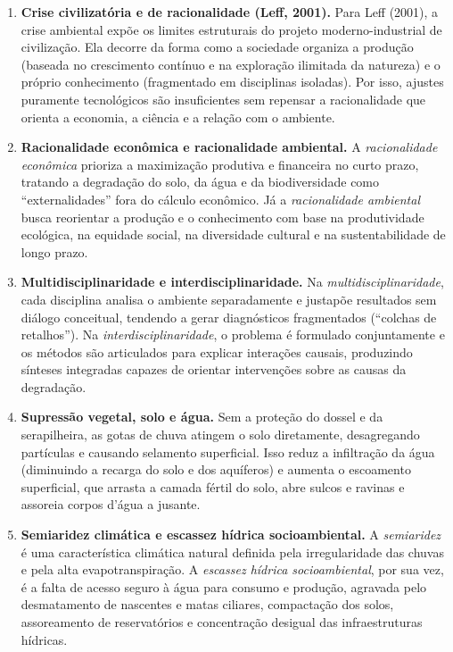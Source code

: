 \clearpage
{}

\begin{boxGabarito}
\begin{enumerate}[leftmargin=1.8em, itemsep=4pt]
  \item \textbf{Crise civilizatória e de racionalidade (Leff, 2001).} Para Leff (2001), a crise ambiental expõe os limites estruturais do projeto moderno-industrial de civilização. Ela decorre da forma como a sociedade organiza a produção (baseada no crescimento contínuo e na exploração ilimitada da natureza) e o próprio conhecimento (fragmentado em disciplinas isoladas). Por isso, ajustes puramente tecnológicos são insuficientes sem repensar a racionalidade que orienta a economia, a ciência e a relação com o ambiente.

  \item \textbf{Racionalidade econômica e racionalidade ambiental.} A \emph{racionalidade econômica} prioriza a maximização produtiva e financeira no curto prazo, tratando a degradação do solo, da água e da biodiversidade como ``externalidades'' fora do cálculo econômico. Já a \emph{racionalidade ambiental} busca reorientar a produção e o conhecimento com base na produtividade ecológica, na equidade social, na diversidade cultural e na sustentabilidade de longo prazo.

  \item \textbf{Multidisciplinaridade e interdisciplinaridade.} Na \emph{multidisciplinaridade}, cada disciplina analisa o ambiente separadamente e justapõe resultados sem diálogo conceitual, tendendo a gerar diagnósticos fragmentados (``colchas de retalhos''). Na \emph{interdisciplinaridade}, o problema é formulado conjuntamente e os métodos são articulados para explicar interações causais, produzindo sínteses integradas capazes de orientar intervenções sobre as causas da degradação.

  \item \textbf{Supressão vegetal, solo e água.} Sem a proteção do dossel e da serapilheira, as gotas de chuva atingem o solo diretamente, desagregando partículas e causando selamento superficial. Isso reduz a infiltração da água (diminuindo a recarga do solo e dos aquíferos) e aumenta o escoamento superficial, que arrasta a camada fértil do solo, abre sulcos e ravinas e assoreia corpos d'água a jusante.

  \item \textbf{Semiaridez climática e escassez hídrica socioambiental.} A \emph{semiaridez} é uma característica climática natural definida pela irregularidade das chuvas e pela alta evapotranspiração. A \emph{escassez hídrica socioambiental}, por sua vez, é a falta de acesso seguro à água para consumo e produção, agravada pelo desmatamento de nascentes e matas ciliares, compactação dos solos, assoreamento de reservatórios e concentração desigual das infraestruturas hídricas.
\end{enumerate}
\end{boxGabarito}

